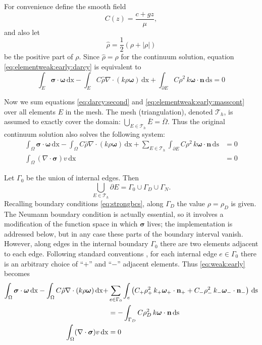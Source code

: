 \documentclass[11pt]{amsart}
\newcommand{\bn}{\mathbf{n}}
\newcommand{\bsigma}{\bm{\sigma}}
\newcommand{\bomega}{\bm{\omega}}
\newcommand{\cT}{\mathcal{T}}
\newcommand{\dx}{\mathrm{dx}}
\newcommand{\ds}{\mathrm{ds}}
\newcommand{\Div}{\nabla\cdot}
\begin{document}
For convenience define the smooth field
\begin{equation}
C(z) = \frac{c + g z}{\mu},
\end{equation}
and also let
\begin{equation}
\hat\rho = \frac{1}{2}(\rho + |\rho|)  \label{eq:rhoplus}
\end{equation}
be the positive part of $\rho$.  Since $\hat\rho=\rho$ for the continuum solution, equation \eqref{eq:elementweak:early:darcy} is equivalent to
\begin{equation}
\int_E \bsigma\cdot \bomega\,\dx - \int_E C \hat\rho \Div(k\rho\bomega)\,\dx + \int_{\partial E} C \rho^2 \, k \bomega\cdot\bn\,\ds = 0 \label{eq:darcy:second}
\end{equation}

Now we sum equations \eqref{eq:darcy:second} and \eqref{eq:elementweak:early:masscont} over all elements $E$ in the mesh.  The mesh (triangulation), denoted $\cT_h$, is assumed to exactly cover the domain: $\bigcup_{E\in\cT_h} \bar E = \bar \Omega$.  Thus the original continuum solution also solves the following system:
\begin{subequations}
\label{eq:weak:early}
\begin{align}
\int_\Omega \bsigma\cdot \bomega\,\dx - \int_\Omega C \hat\rho \Div(k\rho\bomega)\,\dx + \sum_{E\in\cT_h} \int_{\partial E} C \rho^2 \, k \bomega\cdot\bn\,\ds &= 0 \label{eq:weak:early:darcy} \\
\int_\Omega (\Div \bsigma) v\,\dx &= 0 \label{eq:weak:early:masscont}
\end{align}
\end{subequations}

Let $\Gamma_0$ be the union of internal edges.  Then
\begin{equation}
\bigcup_{E\in\cT_h} \partial E = \Gamma_0 \cup \Gamma_D \cup \Gamma_N.
\end{equation}
Recalling boundary conditions \eqref{eq:strongbcs}, along $\Gamma_D$ the value $\rho=\rho_D$ is given.  The Neumann boundary condition is actually essential, so it involves a modification of the function space in which $\bsigma$ lives; the implementation is addressed below, but in any case these parts of the boundary interval vanish.  However, along edges in the internal boundary $\Gamma_0$ there are two elements adjacent to each edge.  Following standard conventions \citep{Arnold2002,Ham2023}, for each internal edge $e\in\Gamma_0$ there is an arbitrary choice of ``$+$'' and ``$-$'' adjacent elements.  Thus \eqref{eq:weak:early} becomes
\begin{subequations}
\label{eq:weak:second}
\begin{align}
\int_\Omega \bsigma\cdot \bomega\,\dx - \int_\Omega C \hat\rho \Div(k\rho\bomega)\,\dx + &\sum_{e\in\Gamma_0} \int_e \left(C_+ \rho_+^2 \, k_+ \bomega_+\cdot\bn_+ + C_- \rho_-^2 \, k_- \bomega_-\cdot\bn_-\right)\,\ds \label{eq:weak:second:darcy} \\
   &= -\int_{\Gamma_D} C \rho_D^2 \, k \bomega\cdot\bn\,\ds \notag \\
\int_\Omega (\Div \bsigma) v\,\dx &= 0 \label{eq:weak:second:masscont}
\end{align}
\end{subequations}
\end{document}
